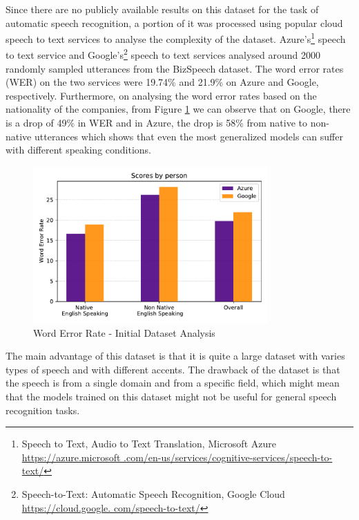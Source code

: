 Since there are no publicly available results on this dataset for the task of automatic speech recognition, a portion of it was processed using popular cloud speech to text services to analyse the complexity of the dataset. Azure's\footnote{Speech to Text, Audio to Text Translation, Microsoft Azure \href{https://azure.microsoft.com/en-us/services/cognitive-services/speech-to-text/}{https://azure.microsoft .com/en-us/services/cognitive-services/speech-to-text/}} speech to text service and Google's\footnote{Speech-to-Text: Automatic Speech Recognition, Google Cloud \href{https://cloud.google.com/speech-to-text/}{https://cloud.google. com/speech-to-text/}} speech to text services analysed around 2000 randomly sampled utterances from the BizSpeech dataset. The word error rates (WER) on the two services were 19.74\% and 21.9\% on Azure and Google, respectively. Furthermore, on analysing the word error rates based on the nationality of the companies, from Figure \ref{fig:wer_cloud} we can observe that on Google, there is a drop of 49\% in WER and in Azure, the drop is 58\% from native to non-native utterances which shows that even the most generalized models can suffer with different speaking conditions. 

\begin{figure}[ht]
  \begin{center}
    \includegraphics[width=0.8\textwidth]{images/wer_cloud.pdf} 
    \caption{Word Error Rate - Initial Dataset Analysis}
    \label{fig:wer_cloud}
  \end{center}
\end{figure}

 The main advantage of this dataset is that it is quite a large dataset with varies types of speech and with different accents. The drawback of the dataset is that the speech is from a single domain and from a specific field, which might mean that the models trained on this dataset might not be useful for general speech recognition tasks.
 
